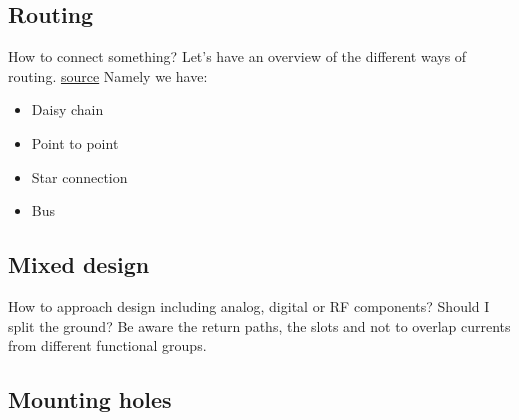 \documentclass[12pt]{article}
\begin{document}
\subsection{Routing}

How to connect something? Let's have an overview of the different ways of routing. \href{https://resources.pcb.cadence.com/blog/pcb-routing-topologies-demystified}{source} Namely we have:

\begin{itemize}
	\item Daisy chain
	\item Point to point
	\item Star connection
	\item Bus
\end{itemize}

\subsection{Mixed design}


How to approach design including analog, digital or RF components? Should I split the ground? Be aware the return paths, the slots and not to overlap currents from different functional groups.



\subsection{Mounting holes}


\end{document}

